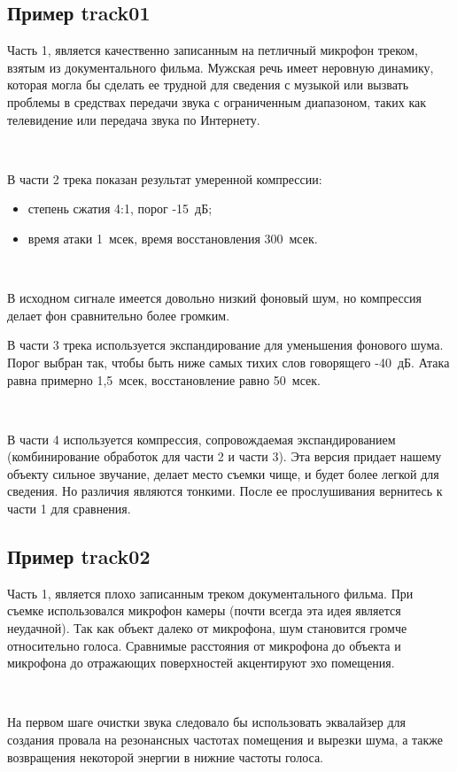 \documentclass{beamer}
\begin{document}
\subsection{Пример track01}
\begin{frame}
Часть 1, является качественно записанным на петличный микрофон треком, взятым из документального фильма. Мужская речь имеет неровную динамику, которая могла бы сделать ее трудной для сведения с музыкой или вызвать проблемы в средствах передачи звука с ограниченным диапазоном, таких как телевидение или передача звука по Интернету.

~

В части 2 трека показан результат умеренной компрессии:
\begin{itemize}
  \item степень сжатия 4:1, порог -15~дБ;
  \item время атаки 1~мсек, время восстановления 300~мсек.
\end{itemize}

~

В исходном сигнале имеется довольно низкий фоновый шум, но компрессия делает фон сравнительно более громким.

\end{frame}
\begin{frame}
В части 3 трека используется экспандирование для уменьшения фонового шума. Порог выбран так, чтобы быть ниже самых тихих слов говорящего -40~дБ. Атака равна примерно 1,5~мсек, восстановление равно 50~мсек.

~

В части 4 используется компрессия, сопровождаемая экспандированием (комбинирование обработок для части 2 и части 3). Эта версия придает нашему объекту сильное звучание, делает место съемки чище, и будет более легкой для сведения. Но различия являются тонкими. После ее прослушивания вернитесь к части 1 для сравнения.
\end{frame}

\subsection{Пример track02}
\begin{frame}
Часть 1, является плохо записанным треком документального фильма. При съемке использовался микрофон камеры (почти всегда эта идея является неудачной). Так как объект далеко от микрофона, шум становится громче относительно голоса. Сравнимые расстояния от микрофона до объекта и микрофона до отражающих поверхностей акцентируют эхо помещения.

~

На первом шаге очистки звука следовало бы использовать эквалайзер для создания провала на резонансных частотах помещения и вырезки шума, а также возвращения некоторой энергии в нижние частоты голоса.
\end{frame}
\end{document}
